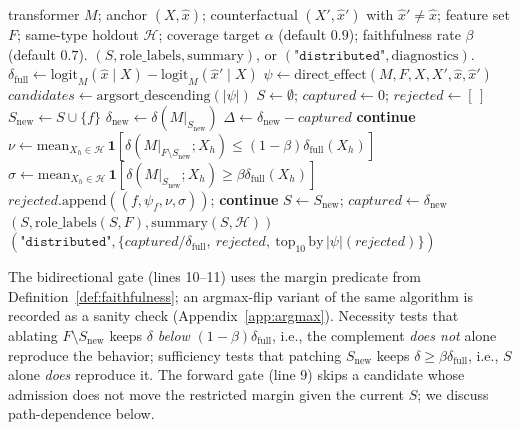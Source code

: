 \documentclass[10pt]{article}
\begin{document}
\begin{algorithm}[t]
\caption{\textsc{Margin\_Crystallize}$(M, (X, \hat x), (X', \hat x'), F, \mathcal{H}, \alpha, \beta)$}
\label{alg:mc}
\begin{algorithmic}[1]
\Require transformer $M$; anchor $(X, \hat x)$; counterfactual $(X', \hat x')$ with $\hat x' \neq \hat x$; feature set $F$; same-type holdout $\mathcal{H}$; coverage target $\alpha$ (default $0.9$); faithfulness rate $\beta$ (default $0.7$).
\Ensure $(S, \text{role\_labels}, \text{summary})$, or $(\texttt{"distributed"}, \text{diagnostics})$.
\State $\delta_{\text{full}} \gets \mathrm{logit}_M(\hat x \mid X) - \mathrm{logit}_M(\hat x' \mid X)$
\State $\psi \gets \mathrm{direct\_effect}(M, F, X, X', \hat x, \hat x')$ 
\State $\mathit{candidates} \gets \mathrm{argsort\_descending}(|\psi|)$
\State $S \gets \emptyset$; $\mathit{captured} \gets 0$; $\mathit{rejected} \gets [\,]$
  \State $S_{\text{new}} \gets S \cup \{f\}$
  \State $\delta_{\text{new}} \gets \delta(M|_{S_{\text{new}}})$ 
  \State $\Delta \gets \delta_{\text{new}} - \mathit{captured}$
   \textbf{continue} 
  \EndIf
  \State $\nu \gets \mathrm{mean}_{X_h \in \mathcal{H}}\,\mathbf{1}\!\left[\delta(M|_{F \setminus S_{\text{new}}}; X_h) \leq (1-\beta)\delta_{\text{full}}(X_h)\right]$ 
  \State $\sigma \gets \mathrm{mean}_{X_h \in \mathcal{H}}\,\mathbf{1}\!\left[\delta(M|_{S_{\text{new}}}; X_h) \geq \beta\delta_{\text{full}}(X_h)\right]$ 
  \If{$\min(\nu, \sigma) < \beta$}
    \State $\mathit{rejected}.\mathrm{append}((f, \psi_f, \nu, \sigma))$; \textbf{continue} 
  \EndIf
  \State $S \gets S_{\text{new}}$; $\mathit{captured} \gets \delta_{\text{new}}$
    \State \Return $(S, \mathrm{role\_labels}(S, F), \mathrm{summary}(S, \mathcal{H}))$
  \EndIf
\EndFor
\State \Return $(\texttt{"distributed"}, \{\mathit{captured}/\delta_{\text{full}},\ \mathit{rejected},\ \mathrm{top}_{10}\,\mathrm{by}\,|\psi|(\mathit{rejected})\})$
\end{algorithmic}
\end{algorithm}

The bidirectional gate (lines 10--11) uses the margin predicate from Definition~\ref{def:faithfulness}; an argmax-flip variant of the same algorithm is recorded as a sanity check (Appendix~\ref{app:argmax}). Necessity tests that ablating $F \setminus S_{\text{new}}$ keeps $\delta$ \emph{below} $(1-\beta)\delta_{\text{full}}$, i.e., the complement \emph{does not} alone reproduce the behavior; sufficiency tests that patching $S_{\text{new}}$ keeps $\delta \geq \beta\delta_{\text{full}}$, i.e., $S$ alone \emph{does} reproduce it. The forward gate (line 9) skips a candidate whose admission does not move the restricted margin given the current $S$; we discuss path-dependence below.
\end{document}
